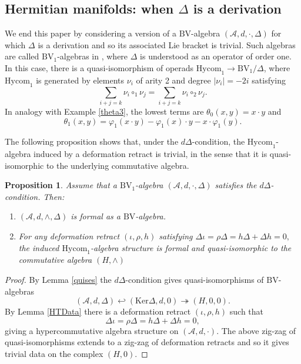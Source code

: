 \documentclass[a4paper]{amsart}
\newtheorem{prop}[theo]{Proposition}
\theoremstyle{definition}
\theoremstyle{theorem}
\newcommand{\Aa}{\mathcal{A}}
\newcommand{\Ker}{\mathrm{Ker}}
\newcommand{\BV}{{\mathrm{BV}}}
\newcommand{\Hycom}{{\mathrm{Hycom}}}
\begin{document}
\subsection{Hermitian manifolds: when $\Delta$ is a derivation}
We end this paper by considering a version of a $\BV$-algebra $(\Aa,d,\cdot,\Delta)$ for which $\Delta$ is a derivation and so its associated Lie bracket is trivial.
Such algebras are called $\BV_1$-algebras in \cite{DST}, where $\Delta$ is understood as an operator of order one.
In this case, there is a quasi-isomorphism of operads $\Hycom_1\to \BV_1/\Delta$,
where  $\Hycom_1$ is generated by elements $\nu_i$ of
 arity 2 and degree $|\nu_i|=-2i$ satisfying
\[\sum_{i+j=k} \nu_i\circ_1\nu_j=\sum_{i+j=k} \nu_i\circ_2\nu_j.\]
In analogy with Example \ref{theta3}, the lowest terms are $\theta_0(x,y)=x\cdot y$ and
\[\theta_1(x,y)=\varphi_1(x\cdot y)-\varphi_1(x)\cdot y-x\cdot \varphi_1(y).\]


The following proposition shows that, under the $d\Delta$-condition, the $\Hycom_1$-algebra
induced by a deformation retract is trivial, in the sense that it is quasi-isomorphic to the underlying commutative algebra.
\begin{prop}\label{Geofftrivial}
 Assume that a $\BV_1$-algebra $(\Aa,d,\cdot,\Delta)$ satisfies the $d\Delta$-condition. Then:
 \begin{enumerate}[(1)]
  \item $(\Aa,d,\wedge,\Delta)$ is formal as a $\BV$-algebra.
  \item For any deformation retract $(\iota,\rho,h)$  satisfying
$\Delta \iota=\rho \Delta=h\Delta+\Delta h=0,$
  the induced $\Hycom_1$-algebra structure is formal and quasi-isomorphic to the commutative algebra $(H,\wedge)$ \end{enumerate}
\end{prop}
\begin{proof}
 By Lemma \ref{quises} the $d\Delta$-condition gives quasi-isomorphisms of $\BV$-algebras 
\[(\Aa,d,\Delta)\hookleftarrow (\Ker\Delta,d,0)\twoheadrightarrow(H,0,0).\]
By Lemma \ref{HTData} there is a deformation retract $(\iota,\rho,h)$ such that
\[\Delta \iota=\rho\Delta=h\Delta+\Delta h=0,\]
giving a hypercommutative algebra structure on $(\Aa,d,\cdot)$. The above zig-zag of quasi-isomorphisms extends to a zig-zag of deformation retracts and so it gives trivial data on the complex $(H,0)$.
\end{proof}
\end{document}
